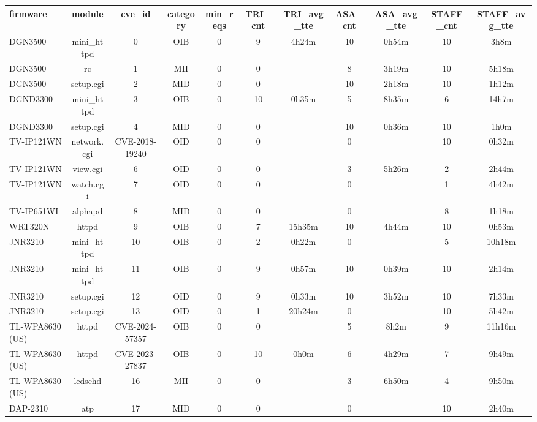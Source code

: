 \begin{table}[ht]
\centering
\renewcommand{\arraystretch}{1.06}
\setlength{\tabcolsep}{4pt}
\begin{tabular}{|l||c|c|c|c|c|c|c|c|c|c|}
\hline
{\sc firmware} & {\sc module} & {\sc cve\_id} & {\sc category} & {\sc min\_reqs} & {\sc TRI\_cnt} & {\sc TRI\_avg\_tte} & {\sc ASA\_cnt} & {\sc ASA\_avg\_tte} & {\sc STAFF\_cnt} & {\sc STAFF\_avg\_tte} \\
\toprule
\hline
DGN3500 & mini\_httpd & 0 & OIB & 0 & 9 & 4h24m & 10 & 0h54m & 10 & 3h8m \\
\hline
DGN3500 & rc & 1 & MII & 0 & 0 &  & 8 & 3h19m & 10 & 5h18m \\
\hline
DGN3500 & setup.cgi & 2 & MID & 0 & 0 &  & 10 & 2h18m & 10 & 1h12m \\
\hline
DGND3300 & mini\_httpd & 3 & OIB & 0 & 10 & 0h35m & 5 & 8h35m & 6 & 14h7m \\
\hline
DGND3300 & setup.cgi & 4 & MID & 0 & 0 &  & 10 & 0h36m & 10 & 1h0m \\
\hline
TV-IP121WN & network.cgi & CVE-2018-19240 & OID & 0 & 0 &  & 0 &  & 10 & 0h32m \\
\hline
TV-IP121WN & view.cgi & 6 & OID & 0 & 0 &  & 3 & 5h26m & 2 & 2h44m \\
\hline
TV-IP121WN & watch.cgi & 7 & OID & 0 & 0 &  & 0 &  & 1 & 4h42m \\
\hline
TV-IP651WI & alphapd & 8 & MID & 0 & 0 &  & 0 &  & 8 & 1h18m \\
\hline
WRT320N & httpd & 9 & OIB & 0 & 7 & 15h35m & 10 & 4h44m & 10 & 0h53m \\
\hline
JNR3210 & mini\_httpd & 10 & OIB & 0 & 2 & 0h22m & 0 &  & 5 & 10h18m \\
\hline
JNR3210 & mini\_httpd & 11 & OIB & 0 & 9 & 0h57m & 10 & 0h39m & 10 & 2h14m \\
\hline
JNR3210 & setup.cgi & 12 & OID & 0 & 9 & 0h33m & 10 & 3h52m & 10 & 7h33m \\
\hline
JNR3210 & setup.cgi & 13 & OID & 0 & 1 & 20h24m & 0 &  & 10 & 5h42m \\
\hline
TL-WPA8630 (US) & httpd & CVE-2024-57357 & OIB & 0 & 0 &  & 5 & 8h2m & 9 & 11h16m \\
\hline
TL-WPA8630 (US) & httpd & CVE-2023-27837 & OIB & 0 & 10 & 0h0m & 6 & 4h29m & 7 & 9h49m \\
\hline
TL-WPA8630 (US) & ledschd & 16 & MII & 0 & 0 &  & 3 & 6h50m & 4 & 9h50m \\
\hline
DAP-2310 & atp & 17 & MID & 0 & 0 &  & 0 &  & 10 & 2h40m \\

\end{tabular}
\end{table}
